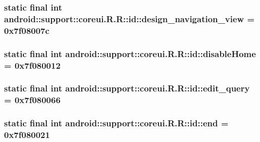 \hypertarget{classandroid_1_1support_1_1coreui_1_1_r_1_1id_7246a91c3f6bd5a40f86d7a6bcabece8}{
\subsubsection[{design\_\-navigation\_\-view}]{\setlength{\rightskip}{0pt plus 5cm}static final int android::support::coreui.R.R::id::design\_\-navigation\_\-view = 0x7f08007c}}
\label{classandroid_1_1support_1_1coreui_1_1_r_1_1id_7246a91c3f6bd5a40f86d7a6bcabece8}


\hypertarget{classandroid_1_1support_1_1coreui_1_1_r_1_1id_cd1d824e94012b0d78f47426110da078}{
\subsubsection[{disableHome}]{\setlength{\rightskip}{0pt plus 5cm}static final int android::support::coreui.R.R::id::disableHome = 0x7f080012}}
\label{classandroid_1_1support_1_1coreui_1_1_r_1_1id_cd1d824e94012b0d78f47426110da078}


\hypertarget{classandroid_1_1support_1_1coreui_1_1_r_1_1id_0b985fb5e8f419846bd115e5e7901855}{
\subsubsection[{edit\_\-query}]{\setlength{\rightskip}{0pt plus 5cm}static final int android::support::coreui.R.R::id::edit\_\-query = 0x7f080066}}
\label{classandroid_1_1support_1_1coreui_1_1_r_1_1id_0b985fb5e8f419846bd115e5e7901855}


\hypertarget{classandroid_1_1support_1_1coreui_1_1_r_1_1id_0654b6adfff24dc47b5164f83e600998}{
\subsubsection[{end}]{\setlength{\rightskip}{0pt plus 5cm}static final int android::support::coreui.R.R::id::end = 0x7f080021}}
\label{classandroid_1_1support_1_1coreui_1_1_r_1_1id_0654b6adfff24dc47b5164f83e600998}


